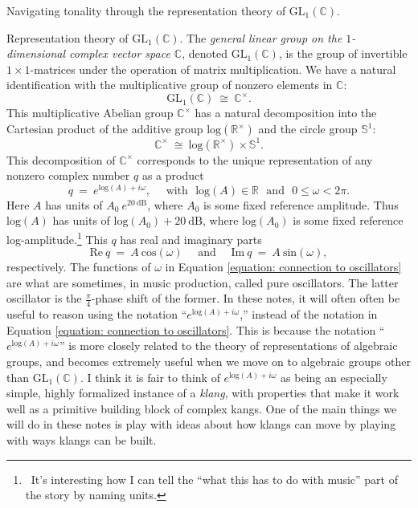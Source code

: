 \documentclass[letterpaper,11pt, reqno]{amsart}
\newtheorem{monodromy theorem}{Monodromy Theorem}[subsection]
\newtheorem{wild conjecture}[theorem]{Wild Conjecture}
\newtheorem{research objectives}{Research objectives}[subsection]
\newtheorem{research question}[theorem]{Research questions}
\newtheorem{aside question}[theorem]{Aside question}
\newtheorem{audio example}[theorem]{\loudspeaker[3] Example}
\newtheorem{blank remark}[theorem]{}
\newtheorem{terminology and comment}[theorem]{Terminology and comment}
\newtheorem{purity hypothesis}[theorem]{Purity hypothesis}
\newtheorem{corollary of the purity hypothesis}[theorem]{Corollary of the purity hypothesis}
\newcommand{\CC} {{\mathbb C}}
\newcommand{\RR} {{\mathbb R}}
\numberwithin{equation}{theorem}
\begin{document}
\begin{section}{Navigating tonality through the representation theory of $\text{GL}_{1}(\CC)$.}
\begin{subsection}{Representation theory of $\text{GL}_{1}(\CC)$.} The {\em general linear group on the $1$-dimensional complex vector space $\CC$}, denoted $\text{GL}_{1}(\CC)$, is the group of invertible $1\times 1$-matrices under the operation of matrix multiplication. We have a natural identification with the multiplicative group of nonzero elements in $\CC$:
	$$
	\text{GL}_{1}(\CC)
	\ \cong\ 
	\CC^\times.
	$$
This multiplicative Abelian group $\CC^\times$ has a natural decomposition into the Cartesian product of the additive group $\text{log}(\RR^\times)$ and the circle group $\mathbb{S}^{1}$:
	$$
	\CC^\times\ \cong\ \text{log}(\RR^\times)\times\mathbb{S}^{1}.
	$$
This decomposition of $\CC^\times$ corresponds to the unique representation of any nonzero complex number $q$ as a product
	$$
	q
	\ =\ 
	e^{\text{log}(A)+i\omega},
	\ \ \ \ \ \ \text{with}\ \ \ 
	\text{log}(A)\in\RR
	\ \ \ \text{and}\ \ \ 
	0\le \omega<2\pi.
	$$
Here $A$ has units of $A_0 \ e^{20\ \text{dB}}$, where $A_{0}$ is some fixed reference amplitude. Thus $\text{log}(A)$ has units of $\text{log}(A_0)+20\ \text{dB}$, where $\text{log}(A_{0})$ is some fixed reference log-amplitude.\footnote{\ It's interesting how I can tell the ``what this has to do with music'' part of the story by naming units.} This $q$ has real and imaginary parts
	\begin{equation}\label{equation: connection to oscillators}
	\text{Re}\ q
	\ =\ 
	A\ \text{cos}(\omega)
	\ \ \ \ \ \ \text{and}\ \ \ \ \ \ 
	\text{Im}\ q
	\ =\ 
	A\ \text{sin}(\omega),
	\end{equation}
respectively. The functions of $\omega$ in Equation \eqref{equation: connection to oscillators} are what are sometimes, in music production, called pure oscillators. The latter oscillator is the $\frac{\pi}{4}$-phase shift of the former. In these notes, it will often often be useful to reason using the notation ``$e^{\text{log}(A)+i\omega}$,'' instead of the notation in Equation \eqref{equation: connection to oscillators}. This is because the notation ``$e^{\text{log}(A)+i\omega}$'' is more closely related to the theory of representations of algebraic groups, and becomes extremely useful when we move on to algebraic groups other than $\text{GL}_{1}(\CC)$. I think it is fair to think of $e^{\text{log}(A)+i\omega}$ as being an especially simple, highly formalized instance of a {\em klang}, with properties that make it work well as a primitive building block of complex kangs. One of the main things we will do in these notes is play with ideas about how klangs can move by playing with ways klangs can be built.


\end{subsection}
\end{section}
\end{document}
